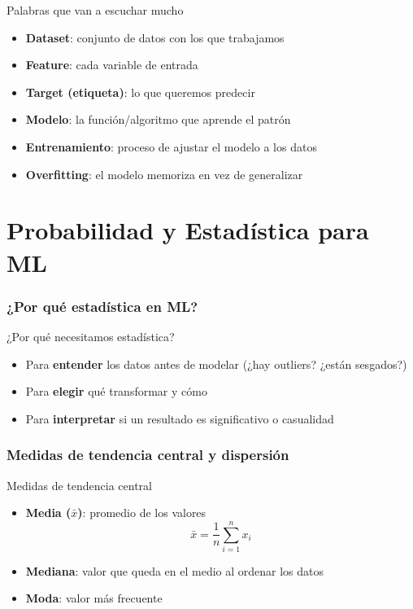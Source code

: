 \begin{frame}{Palabras que van a escuchar mucho}
  \begin{itemize}
    \item \textbf{Dataset}: conjunto de datos con los que trabajamos
    \item \textbf{Feature}: cada variable de entrada
    \item \textbf{Target (etiqueta)}: lo que queremos predecir
    \item \textbf{Modelo}: la función/algoritmo que aprende el patrón
    \item \textbf{Entrenamiento}: proceso de ajustar el modelo a los datos
    \item \textbf{Overfitting}: el modelo memoriza en vez de generalizar
  \end{itemize}
\end{frame}

\part{Probabilidad y Estadística para ML}
\frame{\partpage}

\section{¿Por qué estadística en ML?}

\begin{frame}{¿Por qué necesitamos estadística?}
  \begin{itemize}
    \item Para \textbf{entender} los datos antes de modelar (¿hay outliers? ¿están sesgados?)
    \item Para \textbf{elegir} qué transformar y cómo
    \item Para \textbf{interpretar} si un resultado es significativo o casualidad
  \end{itemize}
\end{frame}

\section{Medidas de tendencia central y dispersión}

\begin{frame}{Medidas de tendencia central}
  \begin{itemize}
    \item \textbf{Media ($\bar{x}$)}: promedio de los valores
      $$\bar{x} = \frac{1}{n}\sum_{i=1}^{n} x_i$$
    \item \textbf{Mediana}: valor que queda en el medio al ordenar los datos
    \item \textbf{Moda}: valor más frecuente
  \end{itemize}
  \pause
\end{frame}

